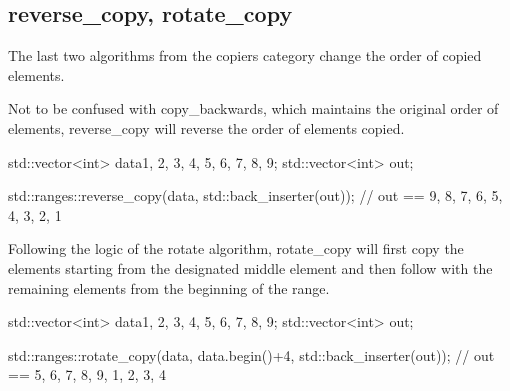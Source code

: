 \begin{box-note}
\end{box-note}

\subsection{reverse\_copy, rotate\_copy}

The last two algorithms from the copiers category change the order of copied elements.



Not to be confused with copy\_backwards, which maintains the original order of elements, reverse\_copy will reverse the order of elements copied.

\begin{box-note}
\begin{cppcode}
std::vector<int> data{1, 2, 3, 4, 5, 6, 7, 8, 9};
std::vector<int> out;

std::ranges::reverse_copy(data, std::back_inserter(out));
// out == { 9, 8, 7, 6, 5, 4, 3, 2, 1 }
\end{cppcode}
\end{box-note}



Following the logic of the rotate algorithm, rotate\_copy will first copy the elements starting from the designated middle element and then follow with the remaining elements from the beginning of the range.

\begin{box-note}
\begin{cppcode}
std::vector<int> data{1, 2, 3, 4, 5, 6, 7, 8, 9};
std::vector<int> out;

std::ranges::rotate_copy(data, data.begin()+4, std::back_inserter(out));
// out == { 5, 6, 7, 8, 9, 1, 2, 3, 4 }
\end{cppcode}
\end{box-note}

